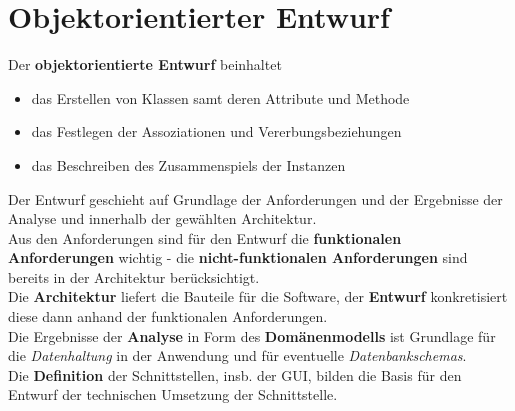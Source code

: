 \section{Objektorientierter Entwurf}


\begin{tcolorbox}[title=Objektorientierter Entwurf]
    \noindent
    Der \textbf{objektorientierte Entwurf} beinhaltet
    \begin{itemize}
        \item das Erstellen von Klassen samt deren Attribute und Methode
        \item das Festlegen der Assoziationen und Vererbungsbeziehungen
        \item das Beschreiben des Zusammenspiels der Instanzen
    \end{itemize}
Der Entwurf geschieht auf Grundlage der Anforderungen und der Ergebnisse der Analyse und innerhalb der gewählten Architektur.\\
Aus den Anforderungen sind für den Entwurf die \textbf{funktionalen Anforderungen} wichtig - die \textbf{nicht-funktionalen Anforderungen} sind bereits in der Architektur berücksichtigt.\\

\noindent
Die \textbf{Architektur} liefert die Bauteile für die Software, der \textbf{Entwurf} konkretisiert diese dann anhand der funktionalen Anforderungen.\\

\noindent
Die Ergebnisse der \textbf{Analyse} in Form des \textbf{Domänenmodells} ist Grundlage für die \textit{Datenhaltung} in der Anwendung und für eventuelle \textit{Datenbankschemas}.\\
Die \textbf{Definition} der Schnittstellen, insb. der GUI, bilden die Basis für den Entwurf der technischen Umsetzung der Schnittstelle.
\end{tcolorbox}